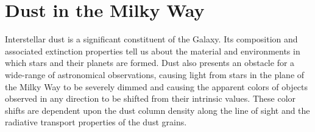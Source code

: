 %
%
%
%
%
%
%

\section{Dust in the Milky Way}
\def\secname{MW_Dust}\label{sec:\secname} %



Interstellar dust is a significant constituent of the Galaxy. Its
composition and associated extinction properties tell us about the
material and environments in which stars and their planets are formed.
Dust also presents an obstacle for a wide-range of astronomical
observations, causing light from stars in the plane of the Milky Way
to be severely dimmed and causing the apparent colors of objects
observed in any direction to be shifted from their intrinsic
values. These color shifts are dependent upon the dust column density
along the line of sight and the radiative transport properties of the
dust grains.

